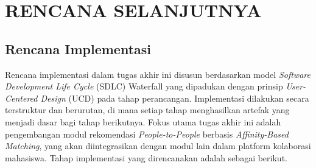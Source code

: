 \chapter{RENCANA SELANJUTNYA}
\label{chap:rencana-selanjutnya}

\section{Rencana Implementasi}
Rencana implementasi dalam tugas akhir ini disusun berdasarkan model \textit{Software Development Life Cycle} (SDLC) Waterfall yang dipadukan dengan prinsip \textit{User-Centered Design} (UCD) pada tahap perancangan. Implementasi dilakukan secara terstruktur dan berurutan, di mana setiap tahap menghasilkan artefak yang menjadi dasar bagi tahap berikutnya. Fokus utama tugas akhir ini adalah pengembangan modul rekomendasi \textit{People-to-People} berbasis \textit{Affinity-Based Matching}, yang akan diintegrasikan dengan modul lain dalam platform kolaborasi mahasiswa. Tahap implementasi yang direncanakan adalah sebagai berikut.

